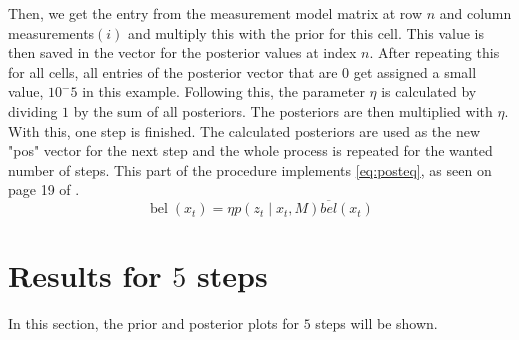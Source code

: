 \documentclass[11pt]{article}
\begin{document}
        Then, we get the entry from the measurement model matrix at row $n$ and column measurements$(i)$ and multiply this with the prior for this cell.
        This value is then saved in the vector for the posterior values at index $n$.\newline
        After repeating this for all cells, all entries of the posterior vector that are $0$ get assigned a small value, $10^-5$ in this example.
        Following this, the parameter $\eta$ is calculated by dividing $1$ by the sum of all posteriors.
        The posteriors are then multiplied with $\eta$.
        With this, one step is finished.
        The calculated posteriors are used as the new "pos" vector for the next step and the whole process is repeated for the wanted number of steps.
This part of the procedure implements \autoref{eq:posteq}, as seen on page 19 of \textcite{merz_autonome_2}.
    \begin{equation}\label{eq:posteq}
        \operatorname{bel}\left(x_{t}\right)=\eta p\left(z_{t} \mid x_{t}, M\right) \overline{b e l}\left(x_{t}\right)
    \end{equation}

        \section{Results for $5$ steps}\label{sec:results}
        In this section, the prior and posterior plots for $5$ steps will be shown.
\end{document}
